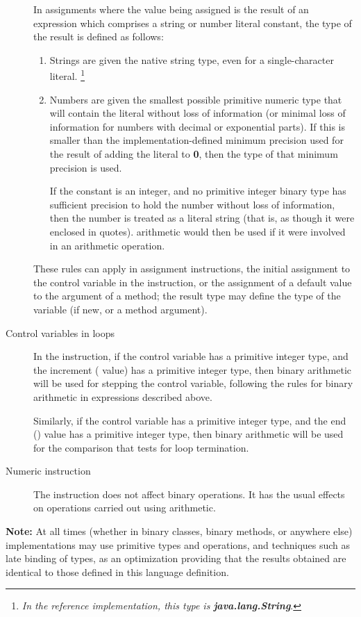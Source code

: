 \begin{description}
In assignments where the value being assigned is the result of an
expression which comprises a string or number literal constant, the
type of the result is defined as follows:
\begin{enumerate}
\item Strings are given the native string type, even for a
single-character literal.
\footnote{
\emph{In the reference implementation, this type is \textbf{java.lang.String}}.
}
\item Numbers are given the smallest possible primitive numeric type that
will contain the literal without loss of information (or minimal loss of
information for numbers with decimal or exponential parts).
If this is smaller than the implementation-defined minimum precision
used for the result of adding the literal to \textbf{0}, then the type
of that minimum precision is used.
 
If the constant is an integer, and no primitive integer binary type has
sufficient precision to hold the number without loss of information,
then the number is treated as a literal string (that is, as though it
were enclosed in quotes).  \nr{} arithmetic would then be used if it
were involved in an arithmetic operation.
\end{enumerate}
 
These rules can apply in assignment instructions, the initial assignment
to the control variable in the  instruction, or the
assignment of a default value to the argument of a method; the result
type may define the type of the variable (if new, or a method argument).
\item[Control variables in loops]
 
In the  instruction, if the control variable has a
primitive integer type, and the increment ( value) has a
primitive integer type, then binary arithmetic will be used for stepping
the control variable, following the rules for binary arithmetic in
expressions described above.
 
Similarly, if the control variable has a primitive integer type, and the
end () value has a primitive integer type, then binary
arithmetic will be used for the comparison that tests for loop
termination.
\item[Numeric instruction]
 
The  instruction does not affect binary operations.
It has the usual effects on operations carried out using \nr{}
arithmetic.
\end{description}
\textbf{Note: }
At all times (whether in binary classes, binary methods, or anywhere
else) implementations may use primitive types and operations, and
techniques such as late binding of types, as an optimization
providing that the results obtained are identical to those defined in
this language definition.
